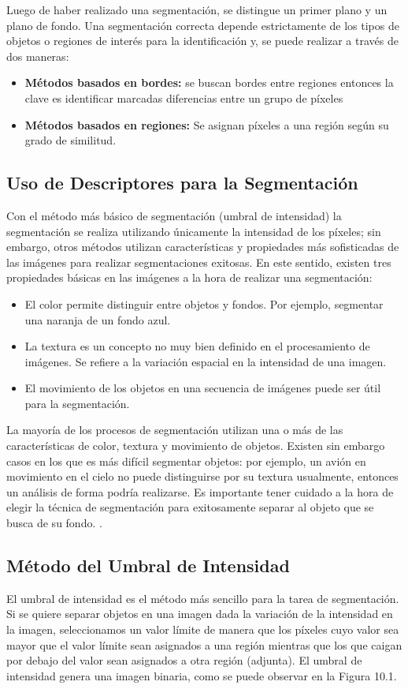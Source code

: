 Luego de haber realizado una segmentación, se distingue un primer plano y un plano de fondo. Una segmentación correcta depende estrictamente de los tipos de objetos o regiones de interés para la identificación y, se puede realizar a través de dos maneras:
\begin{itemize}
\item \textbf{Métodos basados en bordes:} se buscan bordes entre regiones entonces la clave es identificar marcadas diferencias entre un grupo de píxeles
\item \textbf{Métodos basados en regiones:} Se asignan píxeles a una región según su grado de similitud.
\end{itemize}

\subsection{Uso de Descriptores para la Segmentación}
Con el método más básico de segmentación (umbral de intensidad) la segmentación se realiza utilizando únicamente la intensidad de los píxeles; sin embargo, otros métodos utilizan características y propiedades más sofisticadas de las imágenes para realizar segmentaciones exitosas. En este sentido, existen tres propiedades básicas en las imágenes a la hora de realizar una segmentación:
\begin{itemize}
\item El color permite distinguir entre objetos y fondos. Por ejemplo, segmentar una naranja de un fondo azul.
\item La textura es un concepto no muy bien definido en el procesamiento de imágenes. Se refiere a la variación espacial en la intensidad de una imagen.
\item El movimiento de los objetos en una secuencia de imágenes puede ser útil para la segmentación. 
\end{itemize}
La mayoría de los procesos de segmentación utilizan una o más de las características de color, textura y movimiento de objetos. Existen sin embargo casos en los que es más difícil segmentar objetos: por ejemplo, un avión en movimiento en el cielo no puede distinguirse por su textura usualmente, entonces un análisis de forma podría realizarse. Es importante tener cuidado a la hora de elegir la técnica de segmentación para exitosamente separar al objeto que se busca de su fondo. \cite{Solomon2011-xz}.

\subsection{Método del Umbral de Intensidad}
El umbral de intensidad es el método más sencillo para la tarea de segmentación. Si se quiere separar objetos en una imagen dada la variación de la intensidad en la imagen, seleccionamos un valor límite de manera que los píxeles cuyo valor sea mayor que el valor límite sean asignados a una región mientras que los que caigan por debajo del valor sean asignados a otra región (adjunta). El umbral de intensidad genera una imagen binaria, como se puede observar en la Figura 10.1.

